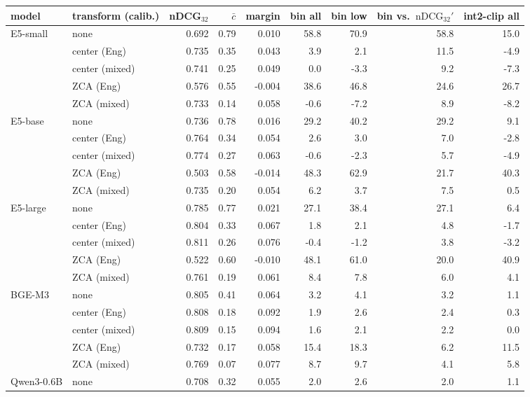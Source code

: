 \begin{table}[t]\centering\footnotesize
\begin{tabular}{llrrrrrrr}
\toprule
model & transform (calib.) & nDCG$_{32}$ & $\bar{c}$ & margin & bin all & bin low & bin vs.\ $\mathrm{nDCG}_{32}'$ & int2-clip all \\
\midrule
E5-small & none & 0.692 & 0.79 & 0.010 & 58.8 & 70.9 & 58.8 & 15.0 \\
 & center (Eng) & 0.735 & 0.35 & 0.043 & 3.9 & 2.1 & 11.5 & -4.9 \\
 & center (mixed) & 0.741 & 0.25 & 0.049 & 0.0 & -3.3 & 9.2 & -7.3 \\
 & ZCA (Eng) & 0.576 & 0.55 & -0.004 & 38.6 & 46.8 & 24.6 & 26.7 \\
 & ZCA (mixed) & 0.733 & 0.14 & 0.058 & -0.6 & -7.2 & 8.9 & -8.2 \\
\midrule
E5-base & none & 0.736 & 0.78 & 0.016 & 29.2 & 40.2 & 29.2 & 9.1 \\
 & center (Eng) & 0.764 & 0.34 & 0.054 & 2.6 & 3.0 & 7.0 & -2.8 \\
 & center (mixed) & 0.774 & 0.27 & 0.063 & -0.6 & -2.3 & 5.7 & -4.9 \\
 & ZCA (Eng) & 0.503 & 0.58 & -0.014 & 48.3 & 62.9 & 21.7 & 40.3 \\
 & ZCA (mixed) & 0.735 & 0.20 & 0.054 & 6.2 & 3.7 & 7.5 & 0.5 \\
\midrule
E5-large & none & 0.785 & 0.77 & 0.021 & 27.1 & 38.4 & 27.1 & 6.4 \\
 & center (Eng) & 0.804 & 0.33 & 0.067 & 1.8 & 2.1 & 4.8 & -1.7 \\
 & center (mixed) & 0.811 & 0.26 & 0.076 & -0.4 & -1.2 & 3.8 & -3.2 \\
 & ZCA (Eng) & 0.522 & 0.60 & -0.010 & 48.1 & 61.0 & 20.0 & 40.9 \\
 & ZCA (mixed) & 0.761 & 0.19 & 0.061 & 8.4 & 7.8 & 6.0 & 4.1 \\
\midrule
BGE-M3 & none & 0.805 & 0.41 & 0.064 & 3.2 & 4.1 & 3.2 & 1.1 \\
 & center (Eng) & 0.808 & 0.18 & 0.092 & 1.9 & 2.6 & 2.4 & 0.3 \\
 & center (mixed) & 0.809 & 0.15 & 0.094 & 1.6 & 2.1 & 2.2 & 0.0 \\
 & ZCA (Eng) & 0.732 & 0.17 & 0.058 & 15.4 & 18.3 & 6.2 & 11.5 \\
 & ZCA (mixed) & 0.769 & 0.07 & 0.077 & 8.7 & 9.7 & 4.1 & 5.8 \\
\midrule
Qwen3-0.6B & none & 0.708 & 0.32 & 0.055 & 2.0 & 2.6 & 2.0 & 1.1 \\

\end{tabular}
\end{table}
